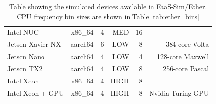 \documentclass[draft,final]{vutinfth} %
\begin{document}
\begin{table}[]
\begin{tabular}{lrrrrr}
Intel NUC                                                            & x86\_64                                                     & 4                                                            & MED                                                         & 16                                                            & -                       \\
Jetson Xavier NX                                                             & aarch64                                                     & 6                                                            & LOW                                                         & 8                                                             & 384-core Volta          \\
Jetson Nano                                                           & aarch64                                                     & 4                                                            & LOW                                                         & 4                                                             & 128-core Maxwell        \\
Jetson TX2                                                           & aarch64                                                     & 4                                                            & LOW                                                         & 8                                                             & 256-core Pascal        \\
Intel Xeon                                                           & x86\_64                                                     & 4                                                            & HIGH                                                        & 8                                                             & -                       \\
Intel Xeon + GPU                                                      & x86\_64                                                     & 4                                                            & HIGH                                                        & 8                                                             & Nvidia Turing GPU       \\ \hline
\end{tabular}
\caption{Table showing the simulated devices available in FaaS-Sim/Ether. CPU frequency bin sizes are shown in Table \ref{tab:ether_bins}}
\label{tab:ether_devices}
\end{table}
\end{document}
